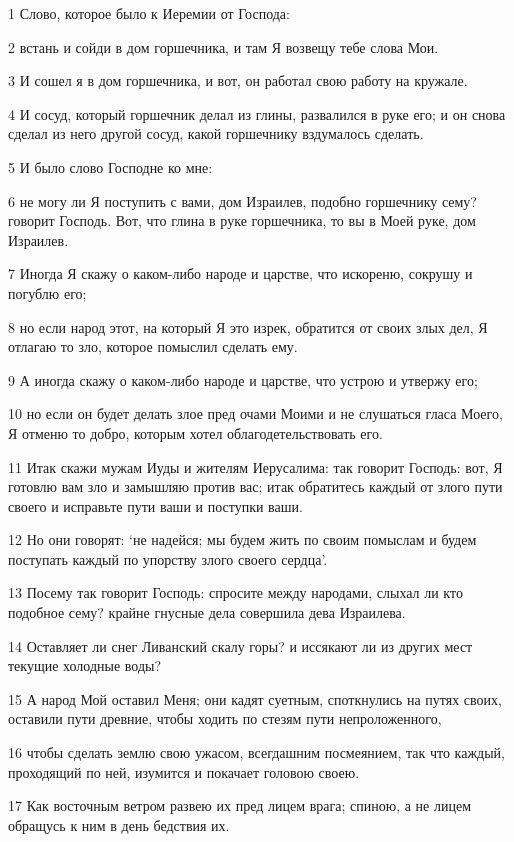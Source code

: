 \par 1 Слово, которое было к Иеремии от Господа:
\par 2 встань и сойди в дом горшечника, и там Я возвещу тебе слова Мои.
\par 3 И сошел я в дом горшечника, и вот, он работал свою работу на кружале.
\par 4 И сосуд, который горшечник делал из глины, развалился в руке его; и он снова сделал из него другой сосуд, какой горшечнику вздумалось сделать.
\par 5 И было слово Господне ко мне:
\par 6 не могу ли Я поступить с вами, дом Израилев, подобно горшечнику сему? говорит Господь. Вот, что глина в руке горшечника, то вы в Моей руке, дом Израилев.
\par 7 Иногда Я скажу о каком-либо народе и царстве, что искореню, сокрушу и погублю его;
\par 8 но если народ этот, на который Я это изрек, обратится от своих злых дел, Я отлагаю то зло, которое помыслил сделать ему.
\par 9 А иногда скажу о каком-либо народе и царстве, что устрою и утвержу его;
\par 10 но если он будет делать злое пред очами Моими и не слушаться гласа Моего, Я отменю то добро, которым хотел облагодетельствовать его.
\par 11 Итак скажи мужам Иуды и жителям Иерусалима: так говорит Господь: вот, Я готовлю вам зло и замышляю против вас; итак обратитесь каждый от злого пути своего и исправьте пути ваши и поступки ваши.
\par 12 Но они говорят: `не надейся; мы будем жить по своим помыслам и будем поступать каждый по упорству злого своего сердца'.
\par 13 Посему так говорит Господь: спросите между народами, слыхал ли кто подобное сему? крайне гнусные дела совершила дева Израилева.
\par 14 Оставляет ли снег Ливанский скалу горы? и иссякают ли из других мест текущие холодные воды?
\par 15 А народ Мой оставил Меня; они кадят суетным, споткнулись на путях своих, оставили пути древние, чтобы ходить по стезям пути непроложенного,
\par 16 чтобы сделать землю свою ужасом, всегдашним посмеянием, так что каждый, проходящий по ней, изумится и покачает головою своею.
\par 17 Как восточным ветром развею их пред лицем врага; спиною, а не лицем обращусь к ним в день бедствия их.
